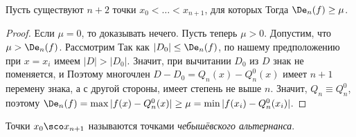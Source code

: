 \documentclass[a4paper]{article}
\begin{document}
\begin{theorem}
Пусть существуют $n+2$ точки $x_0 <\ldots<x_{n+1}$, для которых
  Тогда
$\De_n(f) \ge \mu$.
\end{theorem}
\begin{proof}
Если $\mu = 0$, то доказывать нечего.  Пусть теперь $\mu >
0$. Допустим, что $\mu > \De_n(f)$.  Рассмотрим
  Так как $|D_0| \le \De_n(f)$, по
нашему предположению при $x = x_i$ имеем $|D| > |D_0|$.  Значит, при
вычитании $D_0$ из $D$ знак не поменяется, и
  Поэтому многочлен $D-D_0 = Q_n(x) -
Q_n^0(x)$ имеет $n+1$ перемену знака, а с другой стороны, имеет
степень не выше $n$.  Значит, $Q_n \equiv Q_n^0$, поэтому $\De_n(f) =
\max |f(x)-Q_n^0(x)| \ge \mu = \min |f(x_i)-Q_n^0(x_i)|$.
\end{proof}

\begin{df}
Точки $x_0\sco x_{n+1}$ называются точками \emph{чебышёвского
  альтернанса}.
\end{df}
\end{document}

